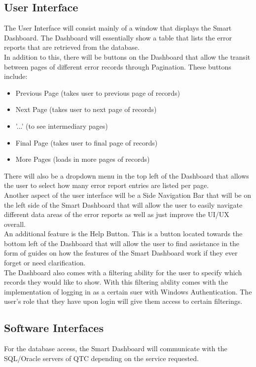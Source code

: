 \documentclass{article}
\begin{document}
\subsection{User Interface}
The User Interface will consist mainly of a window that displays the Smart Dashboard. The Dashboard will essentially show a table that lists the error reports that are retrieved from the database.\\
In addition to this, there will be buttons on the Dashboard that allow the transit between pages of different error records through Pagination. These buttons include:
\begin{itemize}
    \item Previous Page (takes user to previous page of records)
    \item Next Page (takes user to next page of records)
    \item '...' (to see intermediary pages)
    \item Final Page (takes user to final page of records)
    \item More Pages (loads in more pages of records)
\end{itemize}
There will also be a dropdown menu in the top left of the Dashboard that allows the user to select how many error report entries are listed per page.\\

Another aspect of the user interface will be a Side Navigation Bar that will be on the left side of the Smart Dashboard that will allow the user to easily navigate different data areas of the error reports as well as just improve the UI/UX overall.\\

An additional feature is the Help Button. This is a button located towards the bottom left of the Dashboard that will allow the user to find assistance in the form of guides on how the features of the Smart Dashboard work if they ever forget or need clarification.\\

The Dashboard also comes with a filtering ability for the user to specify which records they would like to show. With this filtering ability comes with the implementation of logging in as a certain suer with Windows Authentication. The user's role that they have upon login will give them access to certain filterings.

\subsection{Software Interfaces}
For the database access, the Smart Dashboard will communicate with the SQL/Oracle servers of QTC depending on the service requested.
\end{document}
